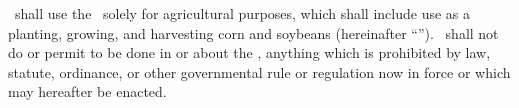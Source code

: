 \lessee\ shall use the \property\ solely for agricultural purposes, which shall include use as a planting, growing, and harvesting corn and soybeans (hereinafter “\permitteduse”). \lessee\ shall not do or permit to be done in or about the \property, anything which is prohibited by law, statute, ordinance, or other governmental rule or regulation now in force or which may hereafter be enacted.
